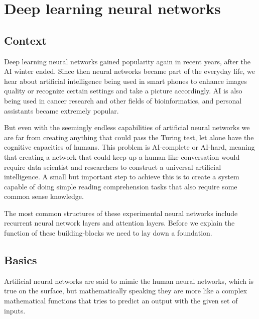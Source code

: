 \chapter{Deep learning neural networks}
\label{chap:deep}
\section{Context}
Deep learning neural networks gained popularity again in recent years, after the AI winter ended. Since then neural networks became part of the everyday life, we hear about artificial intelligence being used in smart phones to enhance images quality or recognize certain settings and take a picture accordingly. AI is also being used in cancer research and other fields of bioinformatics, and personal assistants became extremely popular.

But even with the seemingly endless capabilities of artificial neural networks we are far from creating anything that could pass the Turing test, let alone have the cognitive capacities of humans. This problem is AI-complete or AI-hard, meaning that creating a network that could keep up a human-like conversation would require data scientist and researchers to construct a universal artificial intelligence. A small but important step to achieve this is to create a system capable of doing simple reading comprehension tasks that also require some common sense knowledge.

The most common structures of these experimental neural networks include recurrent neural network layers and attention layers. Before we explain the function of these building-blocks we need to lay down a foundation.

\section{Basics}
Artificial neural networks are said to mimic the human neural networks, which is true on the surface, but mathematically speaking they are more like a complex mathematical functions that tries to predict an output with the given set of inputs.
